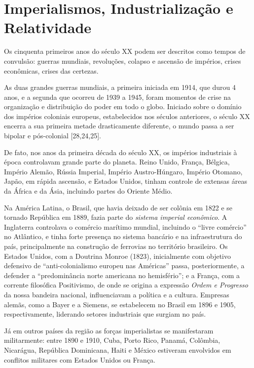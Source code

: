 \documentclass{hipatia}
\begin{document}
\section{Imperialismos, Industrialização e Relatividade}

Os cinquenta primeiros anos do século XX podem ser descritos como tempos de convulsão: guerras mundiais, revoluções, colapso e ascensão de impérios, crises econômicas, crises das certezas.

	As duas grandes guerras mundiais, a primeira iniciada em 1914, que durou 4 anos, e a segunda que ocorreu de 1939 a 1945, foram momentos de crise na organização e distribuição do poder em todo o globo. Iniciado sobre o domínio dos impérios coloniais europeus, estabelecidos nos séculos anteriores, o século XX encerra a sua primeira metade drasticamente diferente, o mundo passa a ser bipolar e pós-colonial [28,24,25].

	De fato, nos anos da primeira década do século XX, os impérios industriais à época controlavam grande parte do planeta. Reino Unido, França, Bélgica, Império Alemão, Rússia Imperial, Império Austro-Húngaro, Império Otomano, Japão, em rápida ascensão, e Estados Unidos, tinham controle de extensas áreas da África e da Ásia, incluindo partes do Oriente Médio.

	Na América Latina, o Brasil, que havia deixado de ser colônia em 1822 e se tornado República em 1889, fazia parte do \textit{sistema imperial econômico}. A Inglaterra controlava o comércio marítimo mundial, incluindo o ``livre comércio'' no Atlântico, e tinha forte presença no sistema bancário e na infraestrutura do país, principalmente na construção de ferrovias no território brasileiro. Os Estados Unidos, com a Doutrina Monroe (1823), inicialmente com objetivo defensivo de ``anti-colonialismo europeu nas Américas'' passa, posteriormente, a defender a ``predominância norte americana no hemisfério''; e a França, com a corrente filosófica Positivismo, de onde se origina a expressão \textit{Ordem e Progresso} da nossa bandeira nacional, influenciavam a política e a cultura. Empresas alemãs, como a Bayer e a Siemens, se estabelecem no Brasil em 1896 e 1905, respectivamente, liderando setores industriais que surgiam no país. 

Já em outros países da região as forças imperialistas se manifestaram militarmente: entre 1890 e 1910, Cuba, Porto Rico, Panamá, Colômbia, Nicarágua, República Dominicana, Haiti e México estiveram envolvidos em conflitos militares com Estados Unidos ou França.
\end{document}
